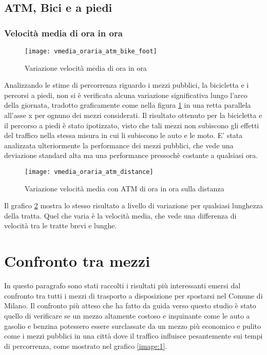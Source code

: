 \subsection{ATM, Bici e a piedi}

\subsubsection{Velocità media di ora in ora}

\begin{figure}[H]
	\texttt{[image: vmedia\_oraria\_atm\_bike\_foot]}
	\caption{Variazione velocità media di ora in ora}
	\label{image:8}
\end{figure}

Analizzando le stime di percorrenza riguardo i mezzi pubblici, la bicicletta e i percorsi a piedi, non si è verificata alcuna variazione significativa lungo l'arco della giornata, tradotto graficamente come nella figura \ref{image:8} in una retta parallela all'asse x per ognuno dei mezzi considerati. Il risultato ottenuto per la bicicletta e il percorso a piedi è stato ipotizzato, visto che tali mezzi non subiscono gli effetti del traffico nella stessa misura in cui li subiscono le auto e le moto. E' stata analizzata ulteriormente la performance dei mezzi pubblici, che vede una deviazione standard alta ma una performance pressochè costante a qualsiasi ora.

\begin{figure}[H]
	\texttt{[image: vmedia\_oraria\_atm\_distance]}
	\caption{Variazione velocità media con ATM di ora in ora sulla distanza}
	\label{image:9}
\end{figure}

Il grafico \ref{image:9} mostra lo stesso risultato a livello di variazione per qualsiasi lunghezza della tratta. Quel che varia è la velocità media, che vede una differenza di velocità tra le tratte brevi e lunghe.

\section{Confronto tra mezzi}

In questo paragrafo sono stati raccolti i risultati più interessanti emersi dal confronto tra tutti i mezzi di trasporto a disposizione per spostarsi nel Comune di Milano. Il confronto più atteso che ha fatto da guida verso questo studio è stato quello di verificare se un mezzo altamente costoso e inquinante come le auto a gasolio e benzina potessero essere surclassate da un mezzo più economico e pulito come i mezzi pubblici in una città dove il traffico influisce pesantemente sui tempi di percorrenza, come mostrato nel grafico \ref{image:1}.

